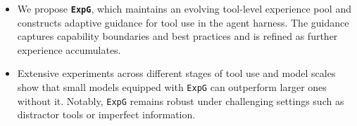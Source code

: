 \documentclass[11pt]{article}
\newcommand{\ours}{\texttt{ExpG}}
\begin{document}
\begin{itemize}
    \item We propose \textbf{\ours}, which maintains an evolving tool-level experience pool and constructs adaptive guidance for tool use in the agent harness. The guidance captures capability boundaries and best practices and is refined as further experience accumulates. 
    \item 
    Extensive experiments across different stages of tool use and model scales show that small models equipped with {\ours} can outperform larger ones without it. Notably, {\ours} remains robust under challenging settings such as distractor tools or imperfect information.
\end{itemize}
\end{document}
